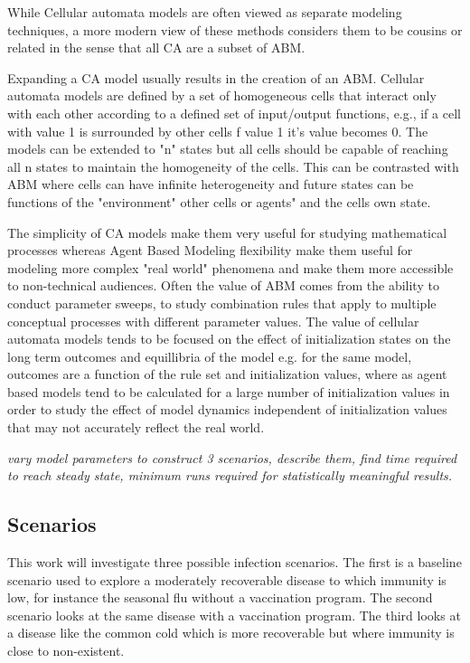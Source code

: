 \documentclass[11pt]{article} %
\begin{document}
While Cellular automata models are often viewed as separate modeling techniques, a more modern view of these methods considers them to be cousins or related in the sense that all CA are a subset of ABM. 

Expanding a CA model usually results in the creation of an ABM.  Cellular automata models are defined by a set of homogeneous cells that interact only with each other according to a defined set of input/output functions, e.g., if a cell with value 1 is surrounded by other cells f value 1 it's value becomes 0. The models can be extended to "n" states but all cells should be capable of reaching all n states to maintain the homogeneity of the cells. This can be contrasted with ABM where cells can have infinite heterogeneity and future states can be functions of the "environment" other cells or agents" and the cells own state. 

The simplicity of CA models make them very useful for studying mathematical processes whereas Agent Based Modeling flexibility make them useful for modeling more complex "real world" phenomena and make them more accessible to non-technical audiences. Often the value of ABM comes from the ability to conduct parameter sweeps, to study combination rules that apply to multiple conceptual processes with different parameter values. The value of cellular automata models tends to be focused on the effect of initialization states on the long term outcomes and equillibria of the model e.g. for the same model, outcomes are a function of the rule set and initialization values, where as agent based models tend to be calculated for a large number of initialization values in order to study the effect of model dynamics independent of initialization values that may not accurately reflect the real world. 

\textit{vary model parameters to construct 3 scenarios, describe them, find time required to reach steady state, minimum runs required for statistically meaningful results.}


\subsection{Scenarios}

This work will investigate three possible infection scenarios. The first is a baseline scenario used to explore a moderately recoverable disease to which immunity is low, for instance the seasonal flu without a vaccination program. The second scenario looks at the same disease with a vaccination program. The third looks at a disease like the common cold which is more recoverable but where immunity is close to non-existent. 
\end{document}
